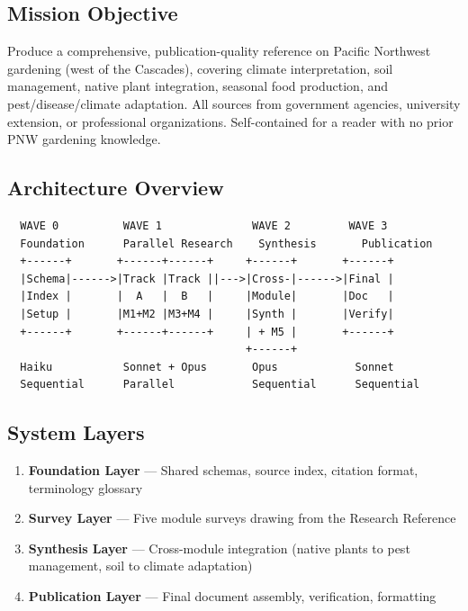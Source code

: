 \documentclass[11pt,letterpaper]{article}
\begin{document}
\subsection{Mission Objective}

Produce a comprehensive, publication-quality reference on Pacific Northwest gardening (west of the Cascades), covering climate interpretation, soil management, native plant integration, seasonal food production, and pest/disease/climate adaptation. All sources from government agencies, university extension, or professional organizations. Self-contained for a reader with no prior PNW gardening knowledge.

\subsection{Architecture Overview}

\begin{asciibox}
\begin{verbatim}
  WAVE 0          WAVE 1              WAVE 2         WAVE 3
  Foundation      Parallel Research    Synthesis       Publication
  +------+       +------+------+     +------+       +------+
  |Schema|------>|Track |Track ||--->|Cross-|------>|Final |
  |Index |       |  A   |  B   |     |Module|       |Doc   |
  |Setup |       |M1+M2 |M3+M4 |     |Synth |       |Verify|
  +------+       +------+------+     | + M5 |       +------+
                                     +------+
  Haiku           Sonnet + Opus       Opus            Sonnet
  Sequential      Parallel            Sequential      Sequential
\end{verbatim}
\end{asciibox}

\subsection{System Layers}

\begin{enumerate}[leftmargin=2em]
  \item \textbf{Foundation Layer} --- Shared schemas, source index, citation format, terminology glossary
  \item \textbf{Survey Layer} --- Five module surveys drawing from the Research Reference
  \item \textbf{Synthesis Layer} --- Cross-module integration (native plants to pest management, soil to climate adaptation)
  \item \textbf{Publication Layer} --- Final document assembly, verification, formatting
\end{enumerate}
\end{document}
